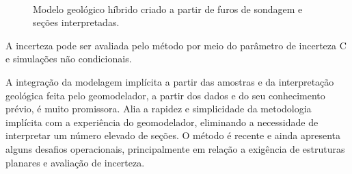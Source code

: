 \begin{figure}[H]
\caption{Modelo geológico híbrido criado a partir de furos de sondagem e seções interpretadas.}\label{mls_model}
\begin{center}
\\
\end{center}
\begin{center}
\end{center}
\end{figure}

A incerteza pode ser avaliada pelo método por meio do parâmetro de incerteza C e simulações não condicionais. 

A integração da modelagem implícita a partir das amostras e da interpretação geológica feita pelo geomodelador, a partir dos dados e do seu conhecimento prévio, é muito promissora. Alia a rapidez e simplicidade da metodologia implícita com a experiência do geomodelador, eliminando a necessidade de interpretar um número elevado de seções. O método é recente e ainda apresenta alguns desafios operacionais, principalmente em relação a exigência de estruturas planares e avaliação de incerteza.

